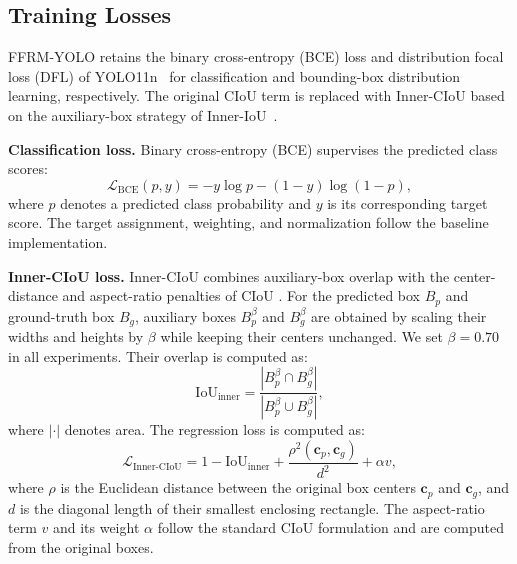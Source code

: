 \documentclass[pdflatex,sn-nature]{sn-jnl}
\begin{document}
\subsection{Training Losses}
\label{sec:training_losses}

FFRM-YOLO retains the binary cross-entropy (BCE) loss and distribution focal loss (DFL) of YOLO11n~\cite{Jocher2024YOLO11} for classification and bounding-box distribution learning, respectively. The original CIoU term is replaced with Inner-CIoU based on the auxiliary-box strategy of Inner-IoU~\cite{Zhang2023InnerIoU}.

\noindent\textbf{Classification loss.}
Binary cross-entropy (BCE) supervises the predicted class scores:
\begin{equation}
\mathcal{L}_{\mathrm{BCE}}(p,y)
=
-y\log p-(1-y)\log(1-p),
\label{eq:classification_loss}
\end{equation}
where $p$ denotes a predicted class probability and $y$ is its corresponding target score. The target assignment, weighting, and normalization follow the baseline implementation.

\noindent\textbf{Inner-CIoU loss.}
Inner-CIoU combines auxiliary-box overlap with the center-distance and aspect-ratio penalties of CIoU \cite{Zheng2020distance,Zhang2023InnerIoU}. For the predicted box $B_p$ and ground-truth box $B_g$, auxiliary boxes $B_p^\beta$ and $B_g^\beta$ are obtained by scaling their widths and heights by $\beta$ while keeping their centers unchanged. We set $\beta=0.70$ in all experiments. Their overlap is computed as:
\begin{equation}
\mathrm{IoU}_{\mathrm{inner}}
=
\frac{|B_p^\beta\cap B_g^\beta|}
{|B_p^\beta\cup B_g^\beta|},
\label{eq:inner_iou}
\end{equation}
where $|\cdot|$ denotes area. The regression loss is computed as:
\begin{equation}
\mathcal{L}_{\mathrm{Inner\text{-}CIoU}}
=
1-\mathrm{IoU}_{\mathrm{inner}}
+
\frac{\rho^2(\mathbf{c}_p,\mathbf{c}_g)}{d^2}
+
\alpha v,
\label{eq:inner_ciou}
\end{equation}
where $\rho$ is the Euclidean distance between the original box centers $\mathbf{c}_p$ and $\mathbf{c}_g$, and $d$ is the diagonal length of their smallest enclosing rectangle. The aspect-ratio term $v$ and its weight $\alpha$ follow the standard CIoU formulation and are computed from the original boxes.
\end{document}
